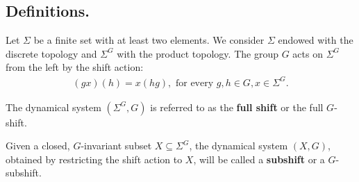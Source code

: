 \documentclass[titlepage,reqno,10pt]{amsart}
\theoremstyle{definition}
\begin{document}
\subsection{Definitions.}
Let $\Sigma$ be a finite set with at least two elements. We consider $\Sigma$ endowed with the discrete topology and $\Sigma^G$ with the product topology.
The group $G$ acts on $\Sigma^G$ from the left by the shift action:
\begin{align*}
    (gx)(h)=x(hg), \mbox{ for every }g,h\in G, x\in \Sigma^G.
\end{align*}

The dynamical system $(\Sigma^G, G)$ is referred to as the \textbf{full shift} or the full $G$-shift.

Given a closed, $G$-invariant subset $X \subseteq \Sigma^G$, the dynamical system $(X, G)$, obtained by restricting the shift action to $X$, will be called a \textbf{subshift} or a  $G$-subshift.
\end{document}

